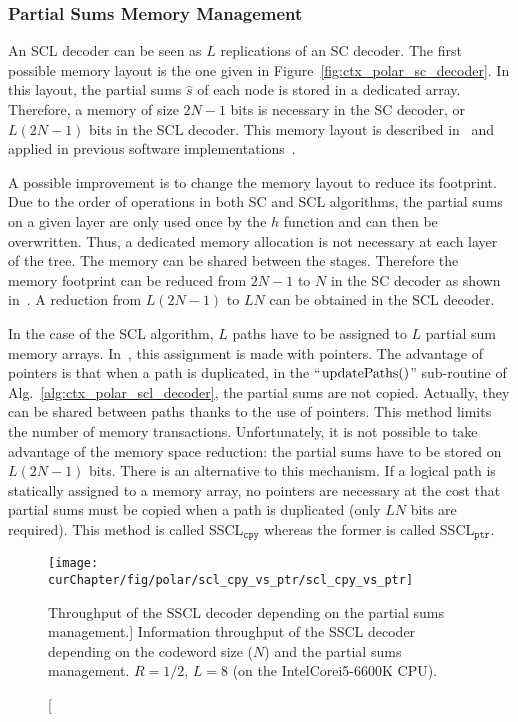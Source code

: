 \subsubsection{Partial Sums Memory Management}
\label{sec:opt_polar_scl_partial_sum}

An SCL decoder can be seen as $L$ replications of an SC decoder. The first
possible memory layout is the one given in
Figure~\ref{fig:ctx_polar_sc_decoder}. In this layout, the partial sums
$\hat{s}$ of each node is stored in a dedicated array. Therefore, a memory of
size $2N-1$ bits is necessary in the SC decoder, or $L(2N -1)$ bits in the SCL
decoder. This memory layout is described in~\cite{Tal2011} and applied in
previous software implementations~\cite{Sarkis2014b,Sarkis2016,Shen2016}.

A possible improvement is to change the memory layout to reduce its footprint.
Due to the order of operations in both SC and SCL algorithms, the partial sums
on a given layer are only used once by the $h$ function and can then be
overwritten. Thus, a dedicated memory allocation is not necessary at each layer
of the tree. The memory can be shared between the stages. Therefore the memory
footprint can be reduced from $2N-1$ to $N$ in the SC decoder as shown
in~\cite{Leroux2013}. A reduction from $L(2N -1)$ to $LN$ can be obtained in the
SCL decoder.

In the case of the SCL algorithm, $L$ paths have to be assigned to $L$ partial
sum memory arrays. In~\cite{Tal2011}, this assignment is made with pointers. The
advantage of pointers is that when a path is duplicated, in the
``$\operatorname*{updatePaths}()$'' sub-routine of Alg.~\ref{alg:ctx_polar_scl_decoder}, the
partial sums are not copied. Actually, they can be shared between paths thanks
to the use of pointers. This method limits the number of memory transactions.
Unfortunately, it is not possible to take advantage of the memory space
reduction: the partial sums have to be stored on $L(2N -1)$ bits. There is an
alternative to this mechanism. If a logical path is statically assigned to a
memory array, no pointers are necessary at the cost that partial sums must be
copied when a path is duplicated (only $LN$ bits are required). This method is
called SSCL$_{\texttt{cpy}}$ whereas the former is called SSCL$_{\texttt{ptr}}$.

\begin{figure}[htp]
  \centering
  \texttt{[image: \\curChapter/fig/polar/scl\_cpy\_vs\_ptr/scl\_cpy\_vs\_ptr]}
  \caption
    [Throughput of the SSCL decoder depending on the partial sums management.]
    {Information throughput of the SSCL decoder depending on the codeword
    size ($N$) and the partial sums management. $R = 1 / 2$, $L = 8$ (on the
    Intel\R Core\TM i5-6600K CPU).}
  \label{plot:opt_polar_scl_cpy_vs_ptr}
\end{figure}


